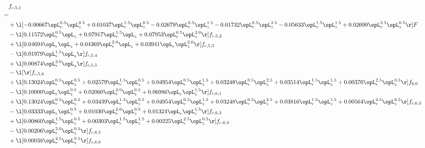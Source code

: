 \begin{alignat}{2} 
\label{eq:f_51_2} 
& f_{c,5,1} \nonumber \\ 
 = \\ 
& + \l[  -0.00667 \opL_r^{0.5} \opL_z^{0.5} +  0.01037 \opL_r^{1.5} \opL_z^{0.5}   -0.02679 \opL_r^{0.5} \opL_z^{1.5}   -0.01732 \opL_r^{0.5} \opL_z^{2.5}   -0.05633 \opL_r^{1.5} \opL_z^{1.5} +  0.02699 \opL_r^{2.5} \opL_z^{0.5}  \r] F \nonumber \\ 
& - \l[  0.11572 \opL_r^{0.5} \opL_z +  0.07917 \opL_r^{1.5} \opL_z +  0.07953 \opL_r^{0.5} \opL_z^{2.0}  \r] f_{c,5,2} \nonumber \\ 
& + \l[  0.04694 \opL_r \opL_z +  0.04369 \opL_r^{2.0} \opL_z +  0.03941 \opL_r \opL_z^{2.0}  \r] f_{c,5,3} \nonumber \\ 
& - \l[  0.01979 \opL_r^{1.5} \opL_z  \r] f_{c,5,4} \nonumber \\ 
& + \l[  0.00874 \opL_r^{2.0} \opL_z  \r] f_{c,5,5} \nonumber \\ 
& - \l[  \r] f_{c,5,6} \nonumber \\ 
& + \l[  0.13024 \opL_r^{0.5} \opL_z^{0.5} +  0.02579 \opL_r^{1.5} \opL_z^{0.5} +  0.04954 \opL_r^{0.5} \opL_z^{1.5} +  0.03248 \opL_r^{0.5} \opL_z^{2.5} +  0.03514 \opL_r^{1.5} \opL_z^{1.5} +  0.00376 \opL_r^{2.5} \opL_z^{0.5}  \r] f_{6,0} \nonumber \\ 
& - \l[  0.10000 \opL_r \opL_z^{0.5} +  0.02060 \opL_r^{2.0} \opL_z^{0.5} +  0.06986 \opL_r \opL_z^{1.5}  \r] f_{c,6,1} \nonumber \\ 
& + \l[  0.13024 \opL_r^{0.5} \opL_z^{0.5} +  0.03439 \opL_r^{1.5} \opL_z^{0.5} +  0.04954 \opL_r^{0.5} \opL_z^{1.5} +  0.03248 \opL_r^{0.5} \opL_z^{2.5} +  0.03816 \opL_r^{1.5} \opL_z^{1.5} +  0.00564 \opL_r^{2.5} \opL_z^{0.5}  \r] f_{c,6,2} \nonumber \\ 
& - \l[  0.03333 \opL_r \opL_z^{0.5} +  0.01030 \opL_r^{2.0} \opL_z^{0.5} +  0.01324 \opL_r \opL_z^{1.5}  \r] f_{c,6,3} \nonumber \\ 
& + \l[  0.00860 \opL_r^{1.5} \opL_z^{0.5} +  0.00303 \opL_r^{1.5} \opL_z^{1.5} +  0.00225 \opL_r^{2.5} \opL_z^{0.5}  \r] f_{c,6,4} \nonumber \\ 
& - \l[  0.00206 \opL_r^{2.0} \opL_z^{0.5}  \r] f_{c,6,5} \nonumber \\ 
& + \l[  0.00038 \opL_r^{2.5} \opL_z^{0.5}  \r] f_{c,6,6} \nonumber \\ 
\end{alignat} 


